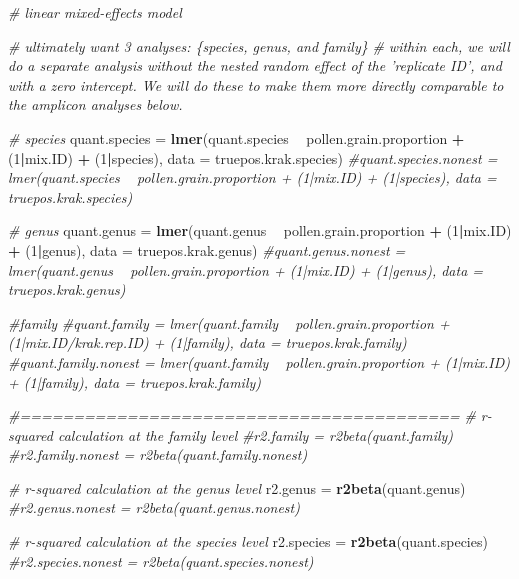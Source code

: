 \documentclass[
]{article}
\newenvironment{Shaded}{\begin{snugshade}}{\end{snugshade}}
\newcommand{\CommentTok}[1]{\textcolor[rgb]{0.56,0.35,0.01}{\textit{#1}}}
\newcommand{\DataTypeTok}[1]{\textcolor[rgb]{0.13,0.29,0.53}{#1}}
\newcommand{\DecValTok}[1]{\textcolor[rgb]{0.00,0.00,0.81}{#1}}
\newcommand{\KeywordTok}[1]{\textcolor[rgb]{0.13,0.29,0.53}{\textbf{#1}}}
\newcommand{\NormalTok}[1]{#1}
\newcommand{\OperatorTok}[1]{\textcolor[rgb]{0.81,0.36,0.00}{\textbf{#1}}}
\newcommand{\StringTok}[1]{\textcolor[rgb]{0.31,0.60,0.02}{#1}}
\begin{document}
\begin{Shaded}
\begin{Highlighting}[]
\CommentTok{# linear mixed-effects model}

\CommentTok{# ultimately want 3 analyses: \{species, genus, and family\}}
\CommentTok{# within each, we will do a separate analysis without the nested random effect of the 'replicate ID', and with a zero intercept. We will do these to make them more directly comparable to the amplicon analyses below. }

\CommentTok{# species}
\NormalTok{quant.species =}\StringTok{ }\KeywordTok{lmer}\NormalTok{(quant.species }\OperatorTok{~}\StringTok{ }\NormalTok{pollen.grain.proportion }\OperatorTok{+}\StringTok{ }\NormalTok{(}\DecValTok{1}\OperatorTok{|}\NormalTok{mix.ID) }\OperatorTok{+}\StringTok{ }\NormalTok{(}\DecValTok{1}\OperatorTok{|}\NormalTok{species), }\DataTypeTok{data =}\NormalTok{ truepos.krak.species)}
\CommentTok{#quant.species.nonest = lmer(quant.species ~ pollen.grain.proportion + (1|mix.ID) + (1|species), data = truepos.krak.species)}

\CommentTok{# genus}
\NormalTok{quant.genus =}\StringTok{ }\KeywordTok{lmer}\NormalTok{(quant.genus }\OperatorTok{~}\StringTok{ }\NormalTok{pollen.grain.proportion }\OperatorTok{+}\StringTok{ }\NormalTok{(}\DecValTok{1}\OperatorTok{|}\NormalTok{mix.ID) }\OperatorTok{+}\StringTok{ }\NormalTok{(}\DecValTok{1}\OperatorTok{|}\NormalTok{genus), }\DataTypeTok{data =}\NormalTok{ truepos.krak.genus)}
\CommentTok{#quant.genus.nonest = lmer(quant.genus ~ pollen.grain.proportion + (1|mix.ID) + (1|genus), data = truepos.krak.genus)}

\CommentTok{#family}
\CommentTok{#quant.family = lmer(quant.family ~ pollen.grain.proportion + (1|mix.ID/krak.rep.ID) + (1|family), data = truepos.krak.family)}
\CommentTok{#quant.family.nonest = lmer(quant.family ~ pollen.grain.proportion + (1|mix.ID) + (1|family), data = truepos.krak.family)}

\CommentTok{#=========================================}
\CommentTok{# r-squared calculation at the family level}
\CommentTok{#r2.family = r2beta(quant.family)}
\CommentTok{#r2.family.nonest = r2beta(quant.family.nonest)}

\CommentTok{# r-squared calculation at the genus level}
\NormalTok{r2.genus =}\StringTok{ }\KeywordTok{r2beta}\NormalTok{(quant.genus)}
\CommentTok{#r2.genus.nonest = r2beta(quant.genus.nonest)}

\CommentTok{# r-squared calculation at the species level}
\NormalTok{r2.species =}\StringTok{ }\KeywordTok{r2beta}\NormalTok{(quant.species)}
\CommentTok{#r2.species.nonest = r2beta(quant.species.nonest)}


\end{Highlighting}
\end{Shaded}
\end{document}
